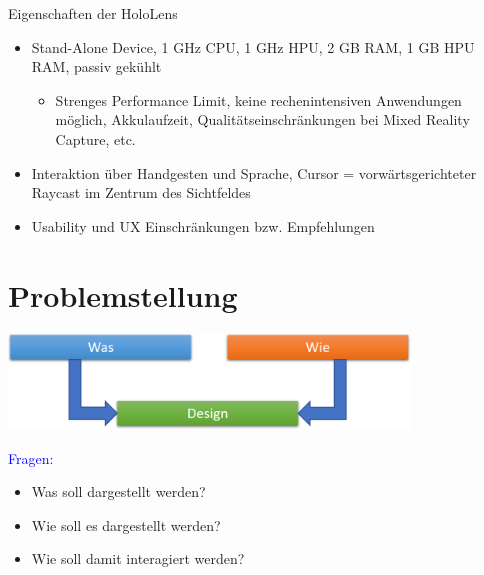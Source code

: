 \begin{frame}[fragile]{Eigenschaften der HoloLens}
\begin{itemize}
\item Stand-Alone Device, 1 GHz CPU, 1 GHz HPU, 2 GB RAM, 1 GB HPU RAM, passiv gekühlt
\begin{itemize}
\pause
\item Strenges Performance Limit, keine rechenintensiven Anwendungen möglich, Akkulaufzeit, Qualitätseinschränkungen bei Mixed Reality Capture, etc.
\end{itemize}
\pause
\item Interaktion über Handgesten und Sprache, Cursor = vorwärtsgerichteter Raycast im Zentrum des Sichtfeldes
\item Usability und UX Einschränkungen bzw. Empfehlungen
\end{itemize}
\end{frame}


\part{Problemstellung}
\label{part:golas}
\begin{frame}
\vspace{-1em}
\begin{center}
\includegraphics[width=0.8\textwidth]{images/Informiertes_Design.png}	
\end{center}
\textcolor{blue}{Fragen:}
\begin{itemize}
\item Was soll dargestellt werden?
\item Wie soll es dargestellt werden?
\item Wie soll damit interagiert werden?
\end{itemize}
\vspace{50px}
\end{frame}
